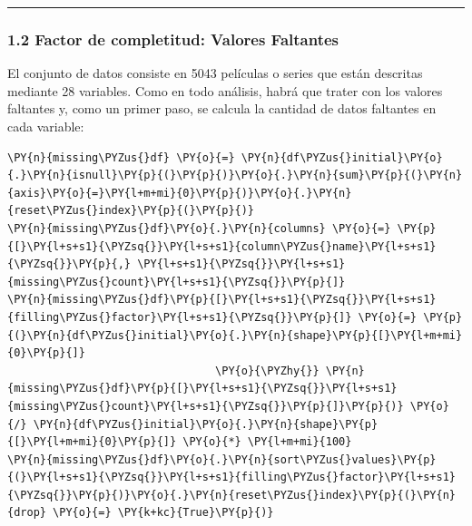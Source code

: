     \begin{center}\rule{0.5\linewidth}{\linethickness}\end{center}

\subsubsection{1.2 Factor de completitud: Valores
Faltantes}\label{factor-de-completitud-valores-faltantes}

El conjunto de datos consiste en 5043 películas o series que están
descritas mediante 28 variables. Como en todo análisis, habrá que trater
con los valores faltantes y, como un primer paso, se calcula la cantidad
de datos faltantes en cada variable:

    \begin{tcolorbox}[breakable, size=fbox, boxrule=1pt, pad at break*=1mm,colback=cellbackground, colframe=cellborder]
\begin{Verbatim}[commandchars=\\\{\}]
\PY{n}{missing\PYZus{}df} \PY{o}{=} \PY{n}{df\PYZus{}initial}\PY{o}{.}\PY{n}{isnull}\PY{p}{(}\PY{p}{)}\PY{o}{.}\PY{n}{sum}\PY{p}{(}\PY{n}{axis}\PY{o}{=}\PY{l+m+mi}{0}\PY{p}{)}\PY{o}{.}\PY{n}{reset\PYZus{}index}\PY{p}{(}\PY{p}{)}
\PY{n}{missing\PYZus{}df}\PY{o}{.}\PY{n}{columns} \PY{o}{=} \PY{p}{[}\PY{l+s+s1}{\PYZsq{}}\PY{l+s+s1}{column\PYZus{}name}\PY{l+s+s1}{\PYZsq{}}\PY{p}{,} \PY{l+s+s1}{\PYZsq{}}\PY{l+s+s1}{missing\PYZus{}count}\PY{l+s+s1}{\PYZsq{}}\PY{p}{]}
\PY{n}{missing\PYZus{}df}\PY{p}{[}\PY{l+s+s1}{\PYZsq{}}\PY{l+s+s1}{filling\PYZus{}factor}\PY{l+s+s1}{\PYZsq{}}\PY{p}{]} \PY{o}{=} \PY{p}{(}\PY{n}{df\PYZus{}initial}\PY{o}{.}\PY{n}{shape}\PY{p}{[}\PY{l+m+mi}{0}\PY{p}{]} 
                                \PY{o}{\PYZhy{}} \PY{n}{missing\PYZus{}df}\PY{p}{[}\PY{l+s+s1}{\PYZsq{}}\PY{l+s+s1}{missing\PYZus{}count}\PY{l+s+s1}{\PYZsq{}}\PY{p}{]}\PY{p}{)} \PY{o}{/} \PY{n}{df\PYZus{}initial}\PY{o}{.}\PY{n}{shape}\PY{p}{[}\PY{l+m+mi}{0}\PY{p}{]} \PY{o}{*} \PY{l+m+mi}{100}
\PY{n}{missing\PYZus{}df}\PY{o}{.}\PY{n}{sort\PYZus{}values}\PY{p}{(}\PY{l+s+s1}{\PYZsq{}}\PY{l+s+s1}{filling\PYZus{}factor}\PY{l+s+s1}{\PYZsq{}}\PY{p}{)}\PY{o}{.}\PY{n}{reset\PYZus{}index}\PY{p}{(}\PY{n}{drop} \PY{o}{=} \PY{k+kc}{True}\PY{p}{)}
\end{Verbatim}
\end{tcolorbox}

